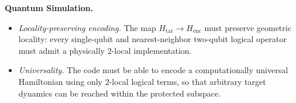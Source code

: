 \documentclass[%
10pt,tightenlines,
superscriptaddress,
 amsmath,amssymb,
 aps,
pra,
]{revtex4-2}
\newcommand{\Htar}{H_{\mathrm{tar}}}
\newcommand{\Henc}{H_{\mathrm{enc}}}
\newcommand{\sy}[1]{\textcolor{blue}{#1}}
\begin{document}
\noindent\textbf{Quantum Simulation.}
\begin{itemize}
    \item \emph{Locality-preserving encoding.} The map $\Htar \rightarrow \Henc$ must preserve geometric locality: every single-qubit and nearest-neighbor two-qubit logical operator must admit a physically $2$-local implementation.
    \item \emph{Universality.} The code must be able to encode a computationally universal Hamiltonian using only $2$-local logical terms, so that arbitrary target dynamics can be reached within the protected subspace.
\end{itemize}



\end{document}
